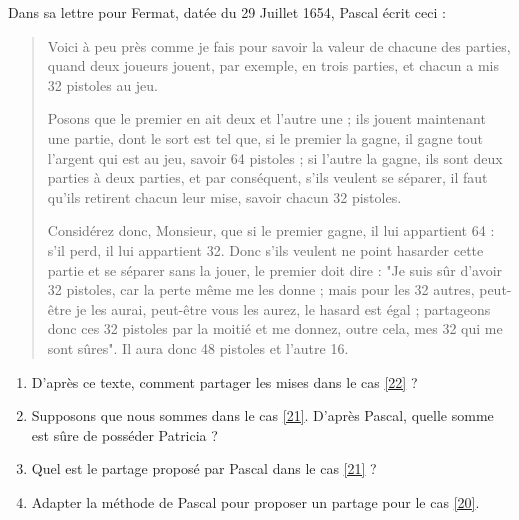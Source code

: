 \documentclass{article}
\begin{document}
Dans sa lettre pour Fermat, datée du 29 Juillet 1654, Pascal écrit ceci :

\begin{quote}
\og Voici à peu près comme je fais pour savoir la valeur de chacune des parties, quand deux joueurs jouent, par exemple, en trois parties, et chacun a mis 32 pistoles au jeu.

Posons que le premier en ait deux et l'autre une ; ils jouent maintenant une partie, dont le sort est tel que, si le premier la gagne, il gagne tout l'argent qui est au jeu, savoir 64 pistoles ; si l'autre la gagne, ils sont deux parties à deux parties, et par conséquent, s'ils veulent se séparer, il faut qu'ils retirent chacun
leur mise, savoir chacun 32 pistoles.

Considérez donc, Monsieur, que si le premier gagne, il lui appartient 64 : s'il perd, il lui appartient 32. Donc s'ils veulent ne point hasarder cette partie et se séparer sans la jouer, le premier doit dire : "Je suis sûr d'avoir 32 pistoles, car la perte même me les donne ; mais pour les 32 autres, peut-être je les aurai, peut-être vous les aurez, le hasard est égal ; partageons donc ces 32 pistoles par la moitié et me donnez, outre cela, mes 32 qui me sont sûres". Il aura donc 48 pistoles et l'autre 16.\fg
\end{quote}

\begin{enumerate}[label=\textbf{Question \arabic*}\hfill]
\item D'après ce texte, comment partager les mises dans le cas \ref{22} ?
\item Supposons que nous sommes dans le cas \ref{21}. D'après Pascal, quelle somme est \og sûre \fg de posséder Patricia ?
\item Quel est le partage proposé par Pascal dans le cas \ref{21} ?
\item Adapter la méthode de Pascal pour proposer un partage pour le cas \ref{20}.
\end{enumerate}
\end{document}
